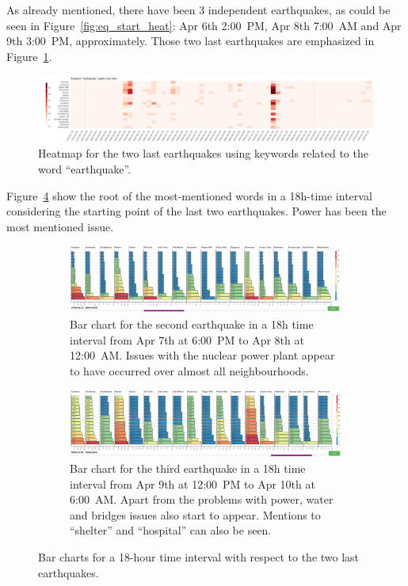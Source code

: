As already mentioned, there have been 3 independent earthquakes, as could be 
seen in Figure~\ref{fig:eq_start_heat}: Apr 6th 2:00~PM, Apr 8th 7:00~AM and Apr 
9th 3:00~PM, approximately. Those two last earthquakes are emphasized in
Figure~\ref{fig:eq_2_3_heat}.

\begin{figure}[!h]
    \centering
    \includegraphics[width=1.00\textwidth]{figs/q2/eq_2_3_heat}
    \caption{Heatmap for the two last earthquakes using keywords related to the
    word ``earthquake''.}
    \label{fig:eq_2_3_heat}
\end{figure}

Figure~\ref{fig:eq_2_3_hbar} show the root of the most-mentioned words in a
18h-time interval considering the starting point of the last two earthquakes.
Power has been the most mentioned issue.

\begin{figure}[!h]
    \centering
    \begin{subfigure}[!h]{0.98\textwidth}
        \centering
        \includegraphics[width=1.00\textwidth]{figs/q2/eq_2_hbar.png}
        \caption{Bar chart for the second earthquake in a 18h time interval from
        Apr 7th at 6:00~PM to Apr 8th at 12:00~AM. Issues with the nuclear power
        plant appear to have occurred over almost all neighbourhoods.}
        \label{fig:eq_2_hbar}
    \end{subfigure}
    \begin{subfigure}[!h]{0.98\textwidth}
        \centering
        \includegraphics[width=1.00\textwidth]{figs/q2/eq_3_hbar.png}
        \caption{Bar chart for the third earthquake in a 18h time interval from
        Apr 9th at 12:00~PM to Apr 10th at 6:00~AM. Apart from the problems with
        power, water and bridges issues also start to appear. Mentions to
        ``shelter'' and ``hospital'' can also be seen.}
        \label{fig:eq_3_hbar}
    \end{subfigure}
    \caption{Bar charts for a 18-hour time interval with respect to the two last
    earthquakes.}
    \label{fig:eq_2_3_hbar}
\end{figure}


